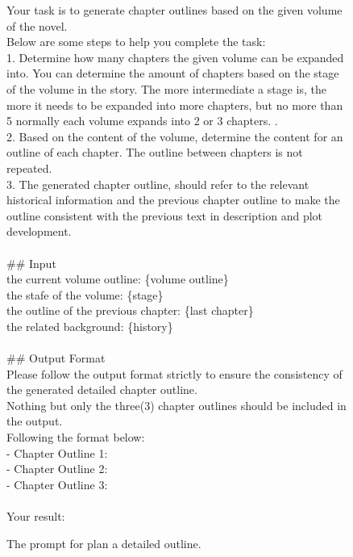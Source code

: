 \begin{figure}[htbp]
\centering
\begin{tcolorbox}
       Your task is to generate chapter outlines based on the given volume of the novel. \\
    Below are some steps to help you complete the task:\\
    
    1. Determine how many chapters the given volume can be expanded into. You can determine the amount of chapters based on the stage of the volume in the story. The more intermediate a stage is, the more it needs to be expanded into more chapters, but no more than 5 normally each volume expands into 2 or 3 chapters. .\\
    2. Based on the content of the volume, determine the content for an outline of each chapter. The outline between chapters is not repeated.\\
    3. The generated chapter outline, should refer to the relevant historical information and the previous chapter outline to make the outline consistent with the previous text in description and plot development.\\
    \\
    \#\# Input\\
    the current volume outline: \{volume outline\}\\
    the stafe of the volume: \{stage\}\\
    the outline of the previous chapter: \{last chapter\}\\
    the related background: \{history\}\\
    \\
    \#\# Output Format \\
    Please follow the output format strictly to ensure the consistency of the generated detailed chapter outline.\\
    Nothing but only the three(3) chapter outlines should be included in the output.\\
    Following the format below:\\
    - Chapter Outline 1: \\
    - Chapter Outline 2: \\
    - Chapter Outline 3: \\
   \\
    Your result:\\
\end{tcolorbox}
\caption{The prompt for plan a detailed outline.}
\label{tab:detailed outline prompt}
\end{figure}


